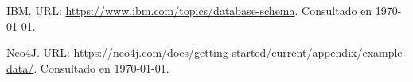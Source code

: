 \documentclass[a4paper,10pt,twocolumn]{article}
\begin{document}
\begin{thebibliography}{99}
	 IBM. URL: \href{https://www.ibm.com/topics/database-schema}
	  {https://www.ibm.com/topics/database-schema}.
		Consultado en \today.

		 Neo4J. URL: \href{https://neo4j.com/docs/getting-started/current/appendix/example-data/}
	  {https://neo4j.com/docs/getting-started/current/appendix/example-data/}.
		Consultado en \today.

\end{thebibliography}

\end{document}
